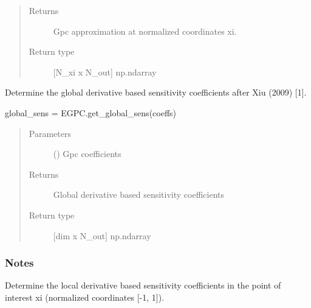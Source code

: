 \documentclass[letterpaper,10pt,english,openany,oneside]{sphinxmanual}
\begin{document}
\begin{fulllineitems}
\begin{fulllineitems}
\begin{quote}
\begin{description}
\begin{itemize}
\end{itemize}

\item[{Returns}] \leavevmode
{} \textendash{} Gpc approximation at normalized coordinates xi.

\item[{Return type}] \leavevmode
{[}N\_xi x N\_out{]} np.ndarray

\end{description}\end{quote}

\end{fulllineitems}


\begin{fulllineitems}
\label{\detokenize{pygpc:pygpc.EGPC.EGPC.get_global_sens}}
Determine the global derivative based sensitivity coefficients after Xiu (2009) {[}1{]}.

global\_sens = EGPC.get\_global\_sens(coeffs)
\begin{quote}\begin{description}
\item[{Parameters}] \leavevmode
{} (\sphinxstyleliteralemphasis{\sphinxupquote{{[}}}\sphinxstyleliteralemphasis{\sphinxupquote{{]} }}) \textendash{} Gpc coefficients

\item[{Returns}] \leavevmode
{} \textendash{} Global derivative based sensitivity coefficients

\item[{Return type}] \leavevmode
{[}dim x N\_out{]} np.ndarray

\end{description}\end{quote}
\subsubsection*{Notes}

\end{fulllineitems}


\begin{fulllineitems}
\label{\detokenize{pygpc:pygpc.EGPC.EGPC.get_local_sens}}
Determine the local derivative based sensitivity coefficients in the point of interest xi
(normalized coordinates {[}-1, 1{]}).


\end{fulllineitems}
\end{fulllineitems}
\end{document}
